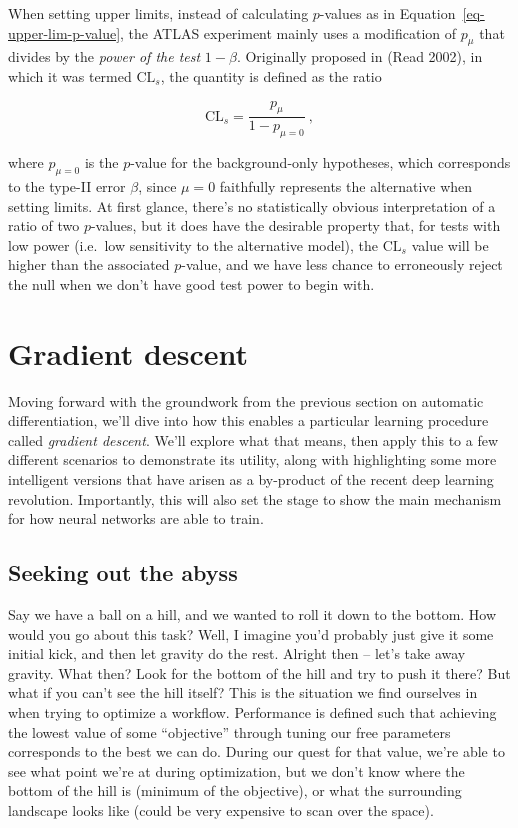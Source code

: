 \documentclass[
  11pt,
  numbers=noendperiod]{book}
\begin{document}
When setting upper limits, instead of calculating \(p\)-values as in
Equation~\ref{eq-upper-lim-p-value}, the ATLAS experiment mainly uses a
modification of \(p_\mu\) that divides by the \emph{power of the test}
\(1-\beta\). Originally proposed in (Read 2002), in which it was termed
\(\mathrm{CL}_s\), the quantity is defined as the ratio

\[
\mathrm{CL}_s = \frac{p_{\mu}}{1-p_{\mu=0}}~,
\]

where \(p_{\mu=0}\) is the \(p\)-value for the background-only
hypotheses, which corresponds to the type-II error \(\beta\), since
\(\mu=0\) faithfully represents the alternative when setting limits. At
first glance, there's no statistically obvious interpretation of a ratio
of two \(p\)-values, but it does have the desirable property that, for
tests with low power (i.e.~low sensitivity to the alternative model),
the \(\mathrm{CL}_s\) value will be higher than the associated
\(p\)-value, and we have less chance to erroneously reject the null when
we don't have good test power to begin with.

\hypertarget{sec-gradient-descent}{%
\chapter{Gradient descent}\label{sec-gradient-descent}}



Moving forward with the groundwork from the previous section on
automatic differentiation, we'll dive into how this enables a particular
learning procedure called \emph{gradient descent}. We'll explore what
that means, then apply this to a few different scenarios to demonstrate
its utility, along with highlighting some more intelligent versions that
have arisen as a by-product of the recent deep learning revolution.
Importantly, this will also set the stage to show the main mechanism for
how neural networks are able to train. 

\hypertarget{introduction}{%
\section{Seeking out the abyss}\label{introduction}}

Say we have a ball on a hill, and we wanted to roll it down to the bottom. How would
you go about this task? Well, I imagine you'd probably just give it some
initial kick, and then let gravity do the rest. Alright then -- let's
take away gravity. What then? Look for the bottom of the hill and try to
push it there? But what if you can't see the hill itself? This is the
situation we find ourselves in when trying to optimize a workflow. Performance is defined such that achieving the lowest value of some ``objective'' through tuning our free parameters corresponds to the best we can do. During our quest for that value, we're
able to see what point we're at during optimization, but we don't know
where the bottom of the hill is (minimum of the objective), or what the
surrounding landscape looks like (could be very expensive to scan over
the space).
\end{document}
